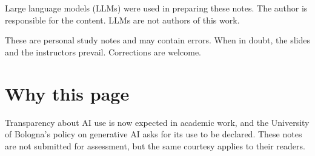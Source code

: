 
Large language models (LLMs) were used in preparing these notes. The author is responsible for the content. LLMs are not authors of this work.

These are personal study notes and may contain errors. When in doubt, the slides and the instructors prevail. Corrections are welcome.

\section*{Why this page}

Transparency about AI use is now expected in academic work, and the University of Bologna's policy on generative AI asks for its use to be declared. These notes are not submitted for assessment, but the same courtesy applies to their readers.
